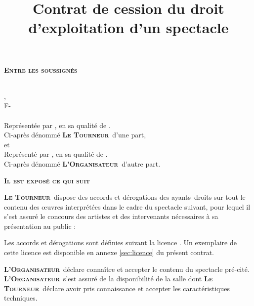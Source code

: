 \documentclass[a4paper,10pt,oneside]{article}
\title{Contrat de cession du droit d'exploitation d'un spectacle \no \NUMBERCONTRAT{}}
\author{\AMMDlong}
\newcommand{\PR}{\textbf{\textsc{Le Tourneur}}}
\newcommand{\OR}{\textbf{\textsc{L'Organisateur}}}
\begin{document}
\maketitle
\thispagestyle{fancy}

{
  \noindent\large\textbf{\textsc{Entre les soussign\'es}}
\vspace{0.3cm}
}

\noindent\emph{{\large \AMMDlong{}}}\\
\ADRAMMD{},\\
F-\CPAMMD{} \VILLEAMMD{}\\
\SIRETAMMD{}\newline
\emph{\TELAMMD{}}\\
Repr\'esent\'ee par \emph{\REPRESENTANTAMMD}, en sa qualit\'e de \emph{\QUALITEREPRESENTANT{}}.\\
Ci-apr\`es d\'enomm\'e \PR\ d'une part,\\

et\\

\noindent\emph{\large \RAISONSOCIALE{}}\newline
\ADRESSE{}\newline
\emph{\TELEPHONE{}}\newline
\SIRET{}\newline
\ENTREPRENEUR{}
\hfill \CAT{}\newline
\noindent Repr\'esent\'e par \emph{\REPRESENTANT{}}, en sa qualit\'e de \emph{\QUALITE{}}.\\
Ci-apr\`es d\'enomm\'e \OR\ d'autre part.\\
\vspace{.5cm}
\begin{center}
  \large
  \textbf{\textsc{Il est expos\'e ce qui suit}}
\end{center}

\PR\ dispose des accords et d\'erogations des ayants--droits
\emph{\PAYS{}} sur tout le contenu des \oe uvres interpr\'et\'ees dans
le cadre du spectacle suivant, pour lequel il s'est assur\'e le concours
des artistes et des intervenants n\'ecessaires \`a sa pr\'esentation au public :
\begin{center}
  \textbf{\textsc{\NOMSPECTACLE{}}}
\end{center}
Les accords et d\'erogations sont d\'efinies suivant la licence
\emph{\LICENCETYPE{}}. Un exemplaire de cette licence est disponible en
annexe \vref{sec:licence} du pr\'esent contrat.

\OR\ d\'eclare conna\^itre et accepter le contenu du spectacle pr\'e-cit\'e.
\OR\ s'est assur\'e de la disponibilit\'e de la salle
\emph{\NOMADRSALLE{}} dont \PR\ d\'eclare avoir pris connaissance et
accepter les caract\'eristiques techniques.
\end{document}
